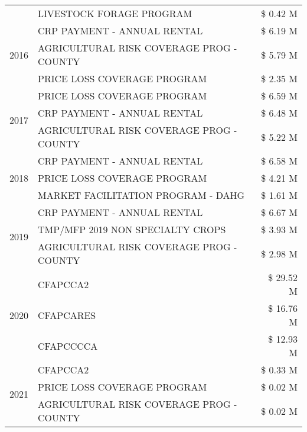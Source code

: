 \begin{tabular}{llr}
 & LIVESTOCK FORAGE PROGRAM & \$ 0.42 M \\
\cline{1-3}
\multirow[t]{3}{*}{2016} & CRP PAYMENT - ANNUAL RENTAL                   & \$ 6.19 M \\
 & AGRICULTURAL RISK COVERAGE PROG - COUNTY      & \$ 5.79 M \\
 & PRICE LOSS COVERAGE PROGRAM                   & \$ 2.35 M \\
\cline{1-3}
\multirow[t]{3}{*}{2017} & PRICE LOSS COVERAGE PROGRAM & \$ 6.59 M \\
 & CRP PAYMENT - ANNUAL RENTAL & \$ 6.48 M \\
 & AGRICULTURAL RISK COVERAGE PROG - COUNTY & \$ 5.22 M \\
\cline{1-3}
\multirow[t]{3}{*}{2018} & CRP PAYMENT - ANNUAL RENTAL & \$ 6.58 M \\
 & PRICE LOSS COVERAGE PROGRAM & \$ 4.21 M \\
 & MARKET FACILITATION PROGRAM - DAHG & \$ 1.61 M \\
\cline{1-3}
\multirow[t]{3}{*}{2019} & CRP PAYMENT - ANNUAL RENTAL & \$ 6.67 M \\
 & TMP/MFP 2019 NON SPECIALTY CROPS & \$ 3.93 M \\
 & AGRICULTURAL RISK COVERAGE PROG - COUNTY & \$ 2.98 M \\
\cline{1-3}
\multirow[t]{3}{*}{2020} & CFAPCCA2 & \$ 29.52 M \\
 & CFAPCARES & \$ 16.76 M \\
 & CFAPCCCCA & \$ 12.93 M \\
\cline{1-3}
\multirow[t]{3}{*}{2021} & CFAPCCA2 & \$ 0.33 M \\
 & PRICE LOSS COVERAGE PROGRAM & \$ 0.02 M \\
 & AGRICULTURAL RISK COVERAGE PROG - COUNTY & \$ 0.02 M \\
\cline{1-3}
\bottomrule
\end{tabular}
